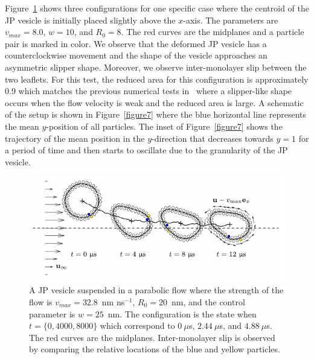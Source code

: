 \documentclass[lineno]{jfm}
\begin{document}

Figure~\ref{figure6} shows three configurations for one specific case
where the centroid of the JP vesicle is initially placed slightly
above the $x$-axis. The parameters are $v_{max} = 8.0$, $w=10$, and
$R_0=8$. The red curves are the midplanes and a particle pair is marked
in color. We observe that the deformed JP vesicle has a
counterclockwise movement and the shape of the vesicle approaches an
asymmetric slipper shape. Moreover, we observe inter-monolayer slip
between the two leaflets. For this test, the reduced area for this
configuration is approximately $0.9$ which matches the previous
numerical tests in~\cite{Kaoui09} where a slipper-like shape occurs when
the flow velocity is weak and the reduced area is large. A schematic of
the setup is shown in Figure~\ref{figure7} where the blue horizontal
line represents the mean $y$-position of all particles. The inset of
Figure~\ref{figure7} shows the trajectory of the mean position in the
$y$-direction that decreases towards $y=1$ for a period of time and then
starts to oscillate due to the granularity of the JP vesicle. 

\begin{figure}
\centering
\includegraphics[width=\textwidth]{Figure6_Wrapper.pdf}
  \caption{\label{figure6} A JP vesicle suspended in a parabolic flow
  where the strength of the flow is $v_{max}=32.8$~nm ns$^{-1}$, $R_0 =
  20$~nm, and the control parameter is $w=25$~nm. The configuration is
  the state when $t=\{0, 4000, 8000\}$ which correspond to $0\ \mu $s, $2.44\ \mu $s, and $4.88\ \mu $s. The red curves are the midplanes. Inter-monolayer slip is observed by comparing the relative  locations of the blue and yellow particles.}
\end{figure}
\end{document}
